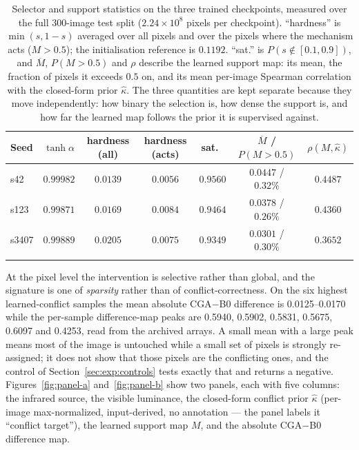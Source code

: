 \documentclass[pdflatex,sn-mathphys-num]{sn-jnl}
\theoremstyle{thmstyleone}%
\theoremstyle{thmstyletwo}%
\theoremstyle{thmstylethree}%
\begin{document}
\begin{table}[t]
\caption{Selector and support statistics on the three trained checkpoints, measured over the full 300-image test split ($2.24\times10^{8}$ pixels per checkpoint). ``hardness'' is $\min(s,1-s)$ averaged over all pixels and over the pixels where the mechanism acts ($M>0.5$); the initialisation reference is $0.1192$. ``sat.'' is $P(s \notin [0.1,0.9])$, and $\overline{M}$, $P(M>0.5)$ and $\rho$ describe the learned support map: its mean, the fraction of pixels it exceeds $0.5$ on, and its mean per-image Spearman correlation with the closed-form prior $\hat\kappa$. The three quantities are kept separate because they move independently: how binary the selection is, how dense the support is, and how far the learned map follows the prior it is supervised against.}
\label{tab:selector}%
\footnotesize
\setlength{\tabcolsep}{4pt}
\begin{tabular}{@{}lcccccc@{}}
\toprule
Seed & $\tanh\alpha$ & hardness (all) & hardness (acts) & sat.\ & $\overline{M}$ / $P(M{>}0.5)$ & $\rho(M,\hat\kappa)$ \\
\midrule
s42   & $0.99982$ & $0.0139$ & $0.0056$ & $0.9560$ & $0.0447$ / $0.32\%$ & $0.4487$ \\
s123  & $0.99871$ & $0.0169$ & $0.0084$ & $0.9464$ & $0.0378$ / $0.26\%$ & $0.4360$ \\
s3407 & $0.99889$ & $0.0205$ & $0.0075$ & $0.9349$ & $0.0301$ / $0.30\%$ & $0.3652$ \\
\botrule
\end{tabular}
\end{table}

At the pixel level the intervention is selective rather than global, and the signature is one of \emph{sparsity} rather than of conflict-correctness. On the six highest learned-conflict samples the mean absolute CGA$-$B0 difference is 0.0125--0.0170 while the per-sample difference-map peaks are 0.5940, 0.5902, 0.5831, 0.5675, 0.6097 and 0.4253, read from the archived arrays. A small mean with a large peak means most of the image is untouched while a small set of pixels is strongly re-assigned; it does not show that those pixels are the conflicting ones, and the control of Section~\ref{sec:exp:controls} tests exactly that and returns a negative. Figures~\ref{fig:panel-a} and~\ref{fig:panel-b} show two panels, each with five columns: the infrared source, the visible luminance, the closed-form conflict prior $\hat\kappa$ (per-image max-normalized, input-derived, no annotation --- the panel labels it ``conflict target''), the learned support map $M$, and the absolute CGA$-$B0 difference map.
\end{document}
